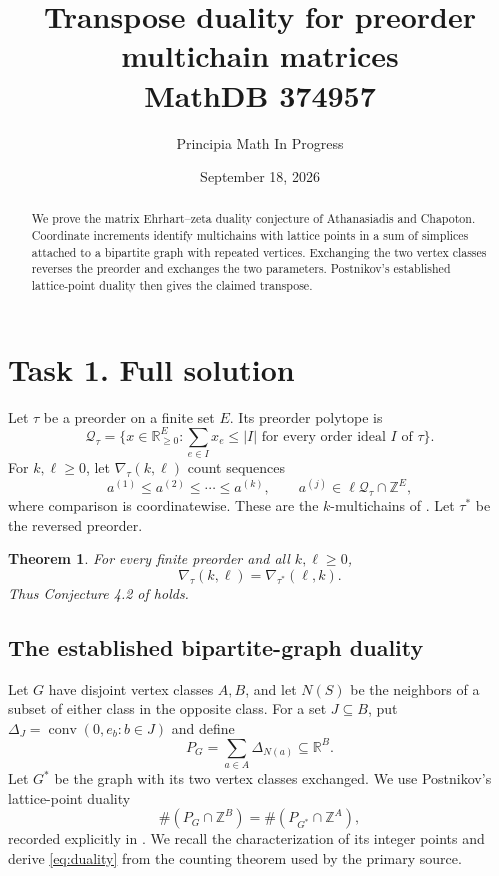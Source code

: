 \documentclass[11pt]{article}
\title{Transpose duality for preorder multichain matrices\\\large MathDB 374957}
\author{Principia Math In Progress}
\date{September 18, 2026}
\newtheorem{theorem}{Theorem}
\newcommand{\Z}{\mathbb Z}
\newcommand{\Q}{\mathcal Q}
\begin{document}
\maketitle
\begin{abstract}
We prove the matrix Ehrhart--zeta duality conjecture of Athanasiadis
and Chapoton. Coordinate increments identify multichains with
lattice points in a sum of simplices attached to a bipartite graph
with repeated vertices. Exchanging the two vertex classes reverses
the preorder and exchanges the two parameters. Postnikov's
established lattice-point duality then gives the claimed transpose.
\end{abstract}

\section*{Task 1. Full solution}
Let $\tau$ be a preorder on a finite set $E$. Its preorder polytope is
\[
 \Q_\tau=\{x\in\mathbb R_{\ge0}^E:
          \sum_{e\in I}x_e\le |I|
          \text{ for every order ideal }I\text{ of }\tau\}.
\]
For $k,\ell\ge0$, let $\nabla_\tau(k,\ell)$ count sequences
\[
 a^{(1)}\le a^{(2)}\le\cdots\le a^{(k)},
 \qquad a^{(j)}\in\ell\Q_\tau\cap\Z^E,
\]
where comparison is coordinatewise. These are the $k$-multichains
of \cite[Section 4.2]{AC}. Let $\tau^*$ be the reversed preorder.

\begin{theorem}\label{thm:main}
For every finite preorder and all $k,\ell\ge0$,
\[
 \boxed{\nabla_\tau(k,\ell)=\nabla_{\tau^*}(\ell,k).}
\]
Thus Conjecture 4.2 of \cite{AC} holds.
\end{theorem}

\subsection*{The established bipartite-graph duality}
Let $G$ have disjoint vertex classes $A,B$, and let $N(S)$ be
the neighbors of a subset of either class in the opposite class.
For a set $J\subseteq B$, put
$\Delta_J=\operatorname{conv}(0,e_b:b\in J)$ and define
\[
 P_G=\sum_{a\in A}\Delta_{N(a)}\subseteq\mathbb R^B.
\]
Let $G^*$ be the graph with its two vertex classes exchanged.
We use Postnikov's lattice-point duality
\begin{equation}\label{eq:duality}
 \#(P_G\cap\Z^B)=\#(P_{G^*}\cap\Z^A),
\end{equation}
recorded explicitly in \cite[Lemmas 2.4--2.6]{D}.
We recall the characterization of its integer points and derive
\eqref{eq:duality} from the counting theorem used by the primary source.
\end{document}
